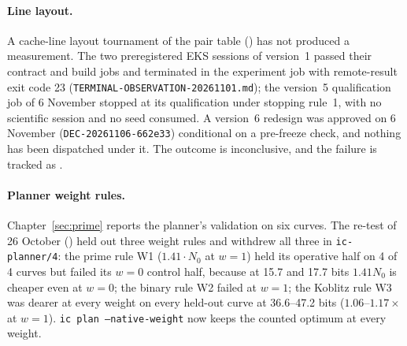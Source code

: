 \paragraph{Line layout.} A cache-line layout tournament of the pair table
() has not produced a
measurement. The two preregistered EKS sessions of version~1 passed their
contract and build jobs and terminated in the experiment job with
remote-result exit code 23 (\texttt{TERMINAL-OBSERVATION-20261101.md}); the
version~5 qualification job of 6 November stopped at its qualification
under stopping rule~1, with no scientific session and no seed consumed. A
version~6 redesign was approved on 6 November (\texttt{DEC-20261106-662e33})
conditional on a pre-freeze check, and nothing has been dispatched under
it. The outcome is inconclusive, and the failure is tracked as
.

\paragraph{Planner weight rules.} Chapter~\ref{sec:prime} reports the
planner's validation on six curves. The re-test of 26 October
() held out three weight rules
and withdrew all three in \texttt{ic-planner/4}: the prime rule W1
($1.41\cdot N_0$ at $w=1$) held its operative half on 4 of 4 curves but
failed its $w=0$ control half, because at 15.7 and 17.7 bits $1.41N_0$ is
cheaper even at $w=0$; the binary rule W2 failed at $w=1$; the Koblitz rule
W3 was dearer at every weight on every held-out curve at 36.6--47.2 bits
($1.06$--$1.17\times$ at $w=1$). \texttt{ic plan --native-weight} now keeps
the counted optimum at every weight.

